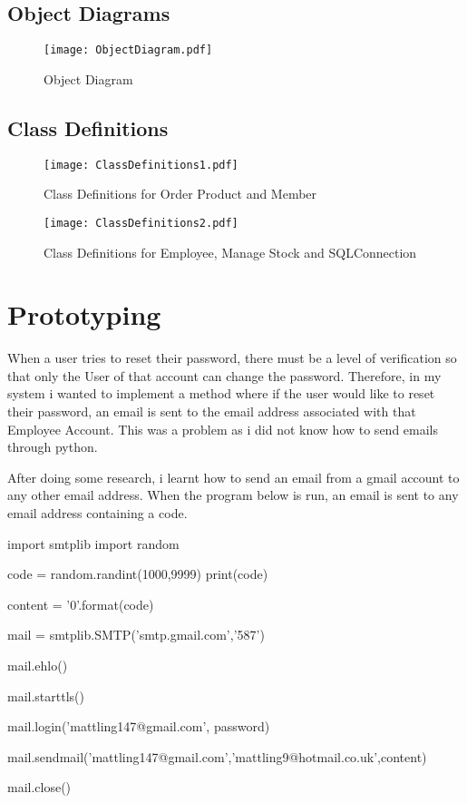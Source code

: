 \subsection{Object Diagrams}

\begin{figure}[H]
\caption{Object Diagram} \label{fig:Object Diagram}
\hfill\texttt{[image: ObjectDiagram.pdf]}\hspace*{\fill}
\end{figure}

\subsection{Class Definitions}

\begin{figure}[H]
\caption{Class Definitions for Order Product and Member} \label{fig:Class Definitions for Order Product and Member}
\hfill\texttt{[image: ClassDefinitions1.pdf]}\hspace*{\fill}
\end{figure}

\begin{figure}[H]
\caption{Class Definitions for Employee, Manage Stock and SQLConnection} \label{fig:Class Definitions for Employee, Manage Stock and SQLConnection}
\hfill\texttt{[image: ClassDefinitions2.pdf]}\hspace*{\fill}
\end{figure}

\pagebreak
 
\section{Prototyping}

When a user tries to reset their password, there must be a level of verification so that only the User of that account can change the password. Therefore, in my system i wanted to implement a method where if the user would like to reset their password, an email is sent to the email address associated with that Employee Account. This was a problem as i did not know how to send emails through python. \par

After doing some research, i learnt how to send an email from a gmail account to any other email address. When the program below is run, an email is sent to any email address containing a code.

\begin{python}
import smtplib
import random

code = random.randint(1000,9999)
print(code)

content = '{0}'.format(code)

mail = smtplib.SMTP('smtp.gmail.com','587')

mail.ehlo()

mail.starttls()

mail.login('mattling147@gmail.com', password)

mail.sendmail('mattling147@gmail.com','mattling9@hotmail.co.uk',content)

mail.close()

\end{python}

